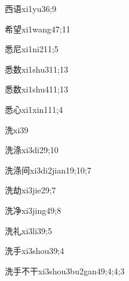\begin{verbete}{西语}{xi1yu3}{6;9}
\end{verbete}
\begin{verbete}{希望}{xi1wang4}{7;11}
\end{verbete}
\begin{verbete}{悉尼}{xi1ni2}{11;5}
\end{verbete}
\begin{verbete}{悉数}{xi1shu3}{11;13}
\end{verbete}
\begin{verbete}{悉数}{xi1shu4}{11;13}
\end{verbete}
\begin{verbete}{悉心}{xi1xin1}{11;4}
\end{verbete}
\begin{verbete}{洗}{xi3}{9}
\end{verbete}
\begin{verbete}{洗涤}{xi3di2}{9;10}
\end{verbete}
\begin{verbete}{洗涤间}{xi3di2jian1}{9;10;7}
\end{verbete}
\begin{verbete}{洗劫}{xi3jie2}{9;7}
\end{verbete}
\begin{verbete}{洗净}{xi3jing4}{9;8}
\end{verbete}
\begin{verbete}{洗礼}{xi3li3}{9;5}
\end{verbete}
\begin{verbete}{洗手}{xi3shou3}{9;4}
\end{verbete}
\begin{verbete}{洗手不干}{xi3shou3bu2gan4}{9;4;4;3}
\end{verbete}

